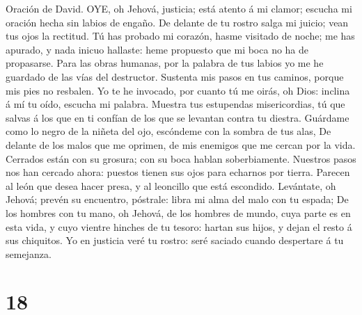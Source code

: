  Oración de David. OYE, oh Jehová, justicia; está atento á
mi clamor; escucha mi oración hecha sin labios de engaño. 
De delante de tu rostro salga mi juicio; vean tus ojos la rectitud.
 Tú has probado mi corazón, hasme visitado de noche; me has
apurado, y nada inicuo hallaste: heme propuesto que mi boca no ha de
propasarse.  Para las obras humanas, por la palabra de tus
labios yo me he guardado de las vías del destructor. 
Sustenta mis pasos en tus caminos, porque mis pies no resbalen.
 Yo te he invocado, por cuanto tú me oirás, oh Dios: inclina
á mí tu oído, escucha mi palabra.  Muestra tus estupendas
misericordias, tú que salvas á los que en ti confían de los que se
levantan contra tu diestra.  Guárdame como lo negro de la
niñeta del ojo, escóndeme con la sombra de tus alas,  De
delante de los malos que me oprimen, de mis enemigos que me cercan por
la vida.  Cerrados están con su grosura; con su boca hablan
soberbiamente.  Nuestros pasos nos han cercado ahora:
puestos tienen sus ojos para echarnos por tierra.  Parecen
al león que desea hacer presa, y al leoncillo que está escondido.
 Levántate, oh Jehová; prevén su encuentro, póstrale: libra
mi alma del malo con tu espada;  De los hombres con tu
mano, oh Jehová, de los hombres de mundo, cuya parte es en esta vida, y
cuyo vientre hinches de tu tesoro: hartan sus hijos, y dejan el resto á
sus chiquitos.  Yo en justicia veré tu rostro: seré saciado
cuando despertare á tu semejanza.

\hypertarget{section-17}{%
\section{18}\label{section-17}}

